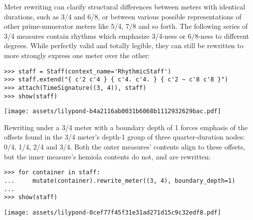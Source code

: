 Meter rewriting can clarify structural differences between meters with
identical durations, such as 3/4 and 6/8, or between various possible
representations of other prime-numerator meters like 5/4, 7/8 and so forth.
The following series of 3/4 measures contain rhythms which emphasize 3/4-ness
or 6/8-ness to different degrees. While perfectly valid and totally legible,
they can still be rewritten to more strongly express one meter over the other:

\begin{comment}
<abjad>
staff = Staff(context_name='RhythmicStaff')
staff.extend("{ c'2 c'4 } { c'4. c'4. } { c'2 ~ c'8 c'8 }")
attach(TimeSignature((3, 4)), staff)
show(staff)
</abjad>
\end{comment}

\begin{singlespacing}
\vspace{-0.5\baselineskip}
\begin{lstlisting}
>>> staff = Staff(context_name='RhythmicStaff')
>>> staff.extend("{ c'2 c'4 } { c'4. c'4. } { c'2 ~ c'8 c'8 }")
>>> attach(TimeSignature((3, 4)), staff)
>>> show(staff)
\end{lstlisting}
\noindent\texttt{[image: assets/lilypond-b4a2116ab0031b6068b1112932629bac.pdf]}
\end{singlespacing}

\noindent Rewriting under a 3/4 meter with a boundary depth of 1 forces
emphasis of the offsets found in the 3/4 meter's depth-1 group of three
quarter-duration nodes: 0/4, 1/4, 2/4 and 3/4. Both the outer measures'
contents align to these offsets, but the inner measure's hemiola contents do
not, and are rewritten:

\begin{comment}
<abjad>
for container in staff:
    mutate(container).rewrite_meter((3, 4), boundary_depth=1)

show(staff)
</abjad>
\end{comment}

\begin{singlespacing}
\vspace{-0.5\baselineskip}
\begin{lstlisting}
>>> for container in staff:
...     mutate(container).rewrite_meter((3, 4), boundary_depth=1)
...
>>> show(staff)
\end{lstlisting}
\noindent\texttt{[image: assets/lilypond-0cef77f45f31e31ad271d15c9c32edf8.pdf]}
\end{singlespacing}

